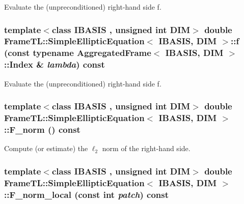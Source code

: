 Evaluate the (unpreconditioned) right-hand side f. \hypertarget{classFrameTL_1_1SimpleEllipticEquation_20fd2926333555fbd8c4ecf6d062c2e5}{
\subsubsection[{f}]{\setlength{\rightskip}{0pt plus 5cm}template$<$class IBASIS , unsigned int DIM$>$ double {\bf FrameTL::SimpleEllipticEquation}$<$ IBASIS, DIM $>$::f (const typename {\bf AggregatedFrame}$<$ IBASIS, DIM $>$::{\bf Index} \& {\em lambda}) const}}
\label{classFrameTL_1_1SimpleEllipticEquation_20fd2926333555fbd8c4ecf6d062c2e5}


Evaluate the (unpreconditioned) right-hand side f. \hypertarget{classFrameTL_1_1SimpleEllipticEquation_ed4364c2a7db00b6c9076290b69147ad}{
\subsubsection[{F\_\-norm}]{\setlength{\rightskip}{0pt plus 5cm}template$<$class IBASIS , unsigned int DIM$>$ double {\bf FrameTL::SimpleEllipticEquation}$<$ IBASIS, DIM $>$::F\_\-norm () const}}
\label{classFrameTL_1_1SimpleEllipticEquation_ed4364c2a7db00b6c9076290b69147ad}


Compute (or estimate) the $\ell_2$ norm of the right-hand side. \hypertarget{classFrameTL_1_1SimpleEllipticEquation_dc2e6668d1d7f143d1ce1a88e18eddc8}{
\subsubsection[{F\_\-norm\_\-local}]{\setlength{\rightskip}{0pt plus 5cm}template$<$class IBASIS , unsigned int DIM$>$ double {\bf FrameTL::SimpleEllipticEquation}$<$ IBASIS, DIM $>$::F\_\-norm\_\-local (const int {\em patch}) const}}
\label{classFrameTL_1_1SimpleEllipticEquation_dc2e6668d1d7f143d1ce1a88e18eddc8}



